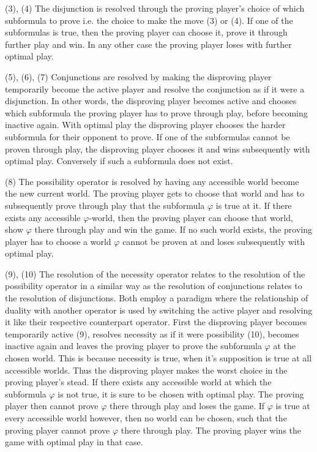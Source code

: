 \documentclass[a4paper,american,10pt]{paper}
\theoremstyle{definition}\newtheorem{definition}{Definition}
\begin{document}
(3), (4) The disjunction is resolved through the proving player's choice of which subformula to prove i.e. the choice to make the move (3) or (4). If one of the subformulas is true, then the proving player can choose it, prove it through further play and win. In any other case the proving player loses with further optimal play.

(5), (6), (7) Conjunctions are resolved by making the disproving player temporarily become the active player and resolve the conjunction as if it were a disjunction. In other words, the disproving player becomes active and chooses which subformula the proving player has to prove through play, before becoming inactive again. With optimal play the disproving player chooses the harder subformula for their opponent to prove. If one of the subformulas cannot be proven through play, the disproving player chooses it and wins subsequently with optimal play. Conversely if such a subformula does not exist.

(8) The possibility operator is resolved by having any accessible world become the new current world. The proving player gets to choose that world and has to subsequently prove through play that the subformula $\varphi$ is true at it. If there exists any accessible $\varphi$-world, then the proving player can choose that world, show $\varphi$ there through play and win the game. If no such world exists, the proving player has to choose a world $\varphi$ cannot be proven at and loses subsequently with optimal play.

(9), (10) The resolution of the necessity operator relates to the resolution of the possibility operator in a similar way as the resolution of conjunctions relates to the resolution of disjunctions. Both employ a paradigm where the relationship of duality with another operator is used by switching the active player and resolving it like their respective counterpart operator. First the disproving player becomes temporarily active (9), resolves necessity as if it were possibility (10), becomes inactive again and leaves the proving player to prove the subformula $\varphi$ at the chosen world. This is because necessity is true, when it's supposition is true at all accessible worlds. Thus the disproving player makes the worst choice in the proving player's stead. If there exists any accessible world at which the subformula $\varphi$ is not true, it is sure to be chosen with optimal play. The proving player then cannot prove $\varphi$ there through play and loses the game. If $\varphi$ is true at every accessible world however, then no world can be chosen, such that the proving player cannot prove $\varphi$ there through play. The proving player wins the game with optimal play in that case.
\end{document}
